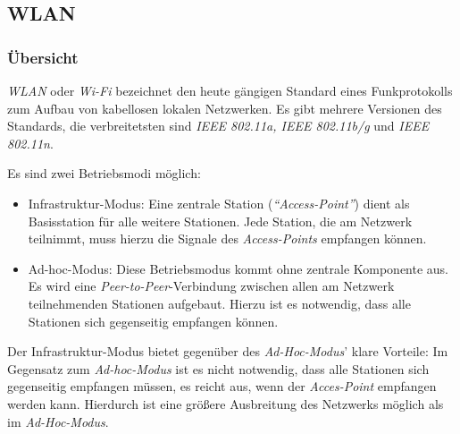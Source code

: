     \subsection{WLAN}\label{wlan}

        \subsubsection{Übersicht}
            \emph{WLAN} oder \emph{Wi-Fi} bezeichnet den heute gängigen Standard eines Funkprotokolls zum Aufbau
            von kabellosen lokalen Netzwerken. Es gibt mehrere Versionen des Standards, die verbreitetsten
            sind \emph{IEEE 802.11a, IEEE 802.11b/g} und \emph{IEEE 802.11n}. 

            Es sind zwei Betriebsmodi möglich:

            \begin{itemize}
                \item{Infrastruktur-Modus:} Eine zentrale Station (\emph{"`Access-Point"'}) dient als Basisstation
                                            für alle weitere Stationen. Jede Station, die am Netzwerk
                                            teilnimmt, muss hierzu die Signale des \emph{Access-Points} 
                                            empfangen können.
                \item{Ad-hoc-Modus:} Diese Betriebsmodus kommt ohne zentrale Komponente aus. Es wird eine
                                     \emph{Peer-to-Peer}-Verbindung zwischen allen am Netzwerk teilnehmenden 
                                     Stationen aufgebaut. Hierzu ist es notwendig, dass alle Stationen
                                     sich gegenseitig empfangen können.
            \end{itemize}

            Der Infrastruktur-Modus bietet gegenüber des \emph{Ad-Hoc-Modus}' klare Vorteile: Im Gegensatz
            zum \emph{Ad-hoc-Modus} ist es nicht notwendig, dass alle Stationen sich gegenseitig empfangen
            müssen, es reicht aus, wenn der \emph{Acces-Point} empfangen werden kann. Hierdurch ist eine
            größere Ausbreitung des Netzwerks möglich als im \emph{Ad-Hoc-Modus}. 

